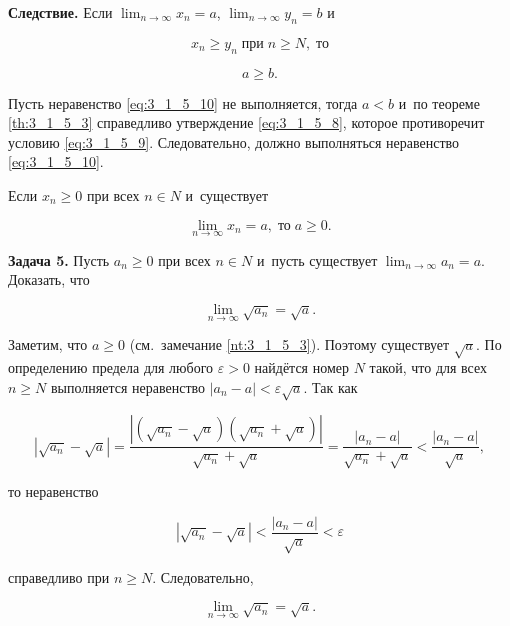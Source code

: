 \textbf{Следствие.}
Если
$\displaystyle \lim_{n \to \infty} x_{n} = a$,
$\displaystyle \lim_{n \to \infty} y_{n} = b$ и

\begin{equation}\label{eq:3_1_5_9}
x_{n} \geqslant y_{n} \; \text{при} \; n \geqslant N, \; \text{то}
\end{equation}

\begin{equation}\label{eq:3_1_5_10}
a \geqslant b.
\end{equation}

Пусть неравенство \eqref{eq:3_1_5_10} не выполняется, тогда $a < b$
и~по теореме \ref{th:3_1_5_3} справедливо утверждение \eqref{eq:3_1_5_8},
которое противоречит условию \eqref{eq:3_1_5_9}.
Следовательно, должно выполняться неравенство \eqref{eq:3_1_5_10}.

\begin{Note}\label{nt:3_1_5_4}
Если $x_{n} \geqslant 0$ при всех $n \in N$ и~существует

\begin{equation*}
\displaystyle \lim_{n \to \infty} x_{n} = a, \; \text{то} \; a \geqslant 0.
\end{equation*}
\end{Note}

\textbf{Задача 5.}\label{ex:3_1_5_5}
Пусть $a_{n} \geqslant 0$ при всех $n \in N$ и~пусть существует
$\displaystyle \lim_{n \to \infty} a_{n} = a$.
Доказать, что

\begin{equation*}
\displaystyle \lim_{n \to \infty} \sqrt{a_{n}} = \sqrt{a}.
\end{equation*}

Заметим, что $a \geqslant 0$ (см.\ замечание \ref{nt:3_1_5_3}).
Поэтому существует $\sqrt{a}$. По определению предела для любого $\varepsilon > 0$
найдётся номер $N$ такой, что для всех $n \geqslant N$ выполняется неравенство
$|a_{n} - a| < \varepsilon\sqrt{a}$. Так как

\begin{equation*}
\displaystyle
\left|
\sqrt{a_{n}} - \sqrt{a} 
\right| =
\frac{
\left| (\sqrt{a_{n}} - \sqrt{a})(\sqrt{a_{n}} + \sqrt{a}) \right|}{
\sqrt{a_{n}} + \sqrt{a}} =
\frac{|a_{n} - a|}{\sqrt{a_{n}} + \sqrt{a}} <
\frac{|a_{n} - a|}{\sqrt{a}},
\end{equation*}

\noindent
то неравенство

\begin{equation*}
\displaystyle
\left| \sqrt{a_{n}} - \sqrt{a} \right| <
\frac{|a_{n} - a|}{\sqrt{a}} <
\varepsilon
\end{equation*}

\noindent
справедливо при $n \geqslant N$. Следовательно,

\begin{equation*}
\displaystyle \lim_{n \to \infty} \sqrt{a_{n}} = \sqrt{a}.
\end{equation*}

